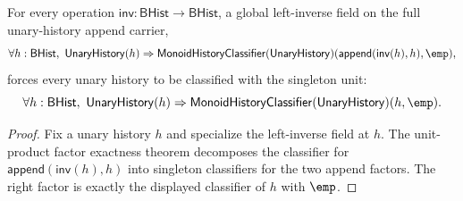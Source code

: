 \begin{theorem}
\label{thm:unary-append-monoid-left-inverse-field-collapses-to-singleton}
For every operation $\mathsf{inv}:\mathsf{BHist}\to\mathsf{BHist}$, a global
left-inverse field on the full unary-history append carrier,
$$
\forall h:\mathsf{BHist},\
\mathsf{UnaryHistory}(h)\Rightarrow
\mathsf{MonoidHistoryClassifier}(\mathsf{UnaryHistory})
(\mathsf{append}(\mathsf{inv}(h),h),\emp),
$$
forces every unary history to be classified with the singleton unit:
$$
\forall h:\mathsf{BHist},\
\mathsf{UnaryHistory}(h)\Rightarrow
\mathsf{MonoidHistoryClassifier}(\mathsf{UnaryHistory})(h,\emp).
$$
\end{theorem}
\begin{proof}
Fix a unary history $h$ and specialize the left-inverse field at $h$. The
unit-product factor exactness theorem decomposes the classifier for
$\mathsf{append}(\mathsf{inv}(h),h)$ into singleton classifiers for the two
append factors. The right factor is exactly the displayed classifier of $h$
with $\emp$.
\end{proof}

